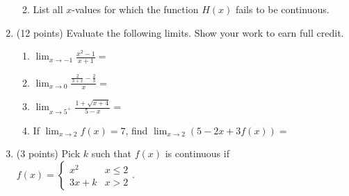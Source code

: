 \documentclass[12pt]{article}
\newcommand{\mblank}[1]{\underline{\hspace{#1}}}
\renewcommand{\d}{\displaystyle}
\begin{document}
\begin{enumerate}
\begin{enumerate}
\vspace{0.1in}
\vspace{0.1in}
\vspace{0.1in}
\item List all $x$-values for which the function $H(x)$ fails to be continuous.\\
\vfill

\end{enumerate}
\newpage
\item (12 points) Evaluate the following limits. Show your work to earn full credit.
	\begin{enumerate}
	\item $\displaystyle{\lim_{x  \to -1}\frac{x^2-1}{x+1}}=$
	\vfill
	\item $\displaystyle{\lim_{x  \to 0}\frac{\frac{2}{3+x}-\frac{2}{3}}{x}}=$
	\vfill
	\item $\displaystyle{\lim_{x  \to 5^+}\frac{1+\sqrt{x+4}}{5-x}}=$
	\vfill
	\item If  $\displaystyle{\lim_{x  \to 2}f(x)=7}$, find $\displaystyle{\lim_{x  \to 2}(5-2x+3f(x))}=$
	\vfill
	\end{enumerate}
\item (3 points) Pick $k$ such that $f(x)$ is continuous if $f(x)=\begin{cases} x^2 & x\leq 2 \\ 3x+k&x>2 \end{cases}.$
\vfill
\end{enumerate}	
\end{document}
